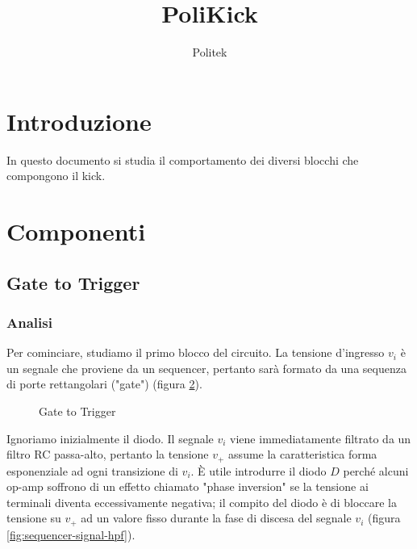 \documentclass{article}
\title{PoliKick}
\author{Politek}
\theoremstyle{definition}
\begin{document}
\maketitle



\section{Introduzione}
In questo documento si studia il comportamento dei diversi blocchi che compongono il kick.

\section{Componenti}

\subsection{Gate to Trigger}

\subsubsection{Analisi}
Per cominciare, studiamo il primo blocco del circuito. La tensione d'ingresso \(v_i\) è un segnale che proviene da un sequencer, pertanto sarà formato da una sequenza di porte rettangolari ("gate") (figura \ref{fig:sequencer-signal}).

\begin{figure}[ht]
    \centering
    
    \label{fig:gate-to-trigger}
    \caption{Gate to Trigger}
\end{figure}

\begin{figure}[ht]
    \centering
    \label{fig:sequencer-signal}
\end{figure}

Ignoriamo inizialmente il diodo. Il segnale \(v_i\) viene immediatamente filtrato da un filtro RC passa-alto, pertanto la tensione \(v_+\) assume la caratteristica forma esponenziale ad ogni transizione di \(v_i\).
È utile introdurre il diodo \(D\) perché alcuni op-amp soffrono di un effetto chiamato "phase inversion" se la tensione ai terminali diventa eccessivamente negativa; il compito del diodo è di bloccare la tensione su \(v_+\) ad un valore fisso durante la fase di discesa del segnale \(v_i\) (figura \ref{fig:sequencer-signal-hpf}).
\end{document}
